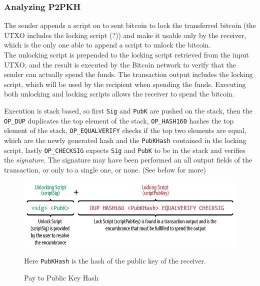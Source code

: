 \subsubsection{Analyzing P2PKH}
The sender appends a script on to sent bitcoin to lock the transferred bitcoin (the UTXO includes the locking script (?)) and make it usable only by the receiver, which is the only one able to append a script to unlock the bitcoin.\\
The unlocking script is prepended to the locking script retrieved from the input UTXO, and the result is executed by the Bitcoin network to verify that the sender can actually spend the funds. The transaction output includes the locking script, which will be used by the recipient when spending the funds.
Executing both unlocking and locking scripts allows the receiver to spend the bitcoin.
\begin{paracol}{2}

   Execution is stack based, so first \texttt{Sig} and \texttt{PubK} are pushed on the stack, then the \texttt{OP\_DUP} duplicates the top element of the stack, \texttt{OP\_HASH160} hashes the top element of the stack, \texttt{OP\_EQUALVERIFY} checks if the top two elements are equal, which are the newly generated hash and the \texttt{PubKHash} contained in the locking script,
   lastly \texttt{OP\_CHECKSIG} expects \texttt{Sig} and \texttt{PubK} to be in the stack and verifies the \textit{signature}.
   The signature may have been performed an all output fields of the transaction, or only to a single one, or none. (See below for more)
   
   \switchcolumn
   \colfill
   \begin{figure}[htbp]
      \centering
      \includegraphics{images/bitcoin_p2pkh.png}
      \caption{Pay to Public Key Hash}
      Here \texttt{PubKHash} is the hash of the public key of the receiver.
      \label{fig:bitcoin_p2pkh}
   \end{figure}
   \colfill
   
\end{paracol}

